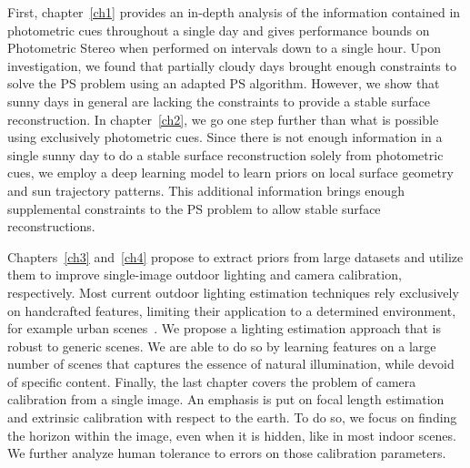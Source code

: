 First, chapter~\ref{ch1} provides an in-depth analysis of the information contained in photometric cues throughout a single day and gives performance bounds on Photometric Stereo when performed on intervals down to a single hour. Upon investigation, we found that partially cloudy days brought enough constraints to solve the PS problem using an adapted PS algorithm. However, we show that sunny days in general are lacking the constraints to provide a stable surface reconstruction. In chapter~\ref{ch2}, we go one step further than what is possible using exclusively photometric cues. Since there is not enough information in a single sunny day to do a stable surface reconstruction solely from photometric cues, we employ a deep learning model to learn priors on local surface geometry and sun trajectory patterns. This additional information brings enough supplemental constraints to the PS problem to allow stable surface reconstructions. 

Chapters~\ref{ch3} and~\ref{ch4} propose to extract priors from large datasets and utilize them to improve single-image outdoor lighting and camera calibration, respectively. Most current outdoor lighting estimation techniques rely exclusively on handcrafted features, limiting their application to a determined environment, for example urban scenes~\cite{lalonde-ijcv-12}. We propose a lighting estimation approach that is robust to generic scenes. We are able to do so by learning features on a large number of scenes that captures the essence of natural illumination, while devoid of specific content. Finally, the last chapter covers the problem of camera calibration from a single image. An emphasis is put on focal length estimation and extrinsic calibration with respect to the earth. To do so, we focus on finding the horizon within the image, even when it is hidden, like in most indoor scenes. We further analyze human tolerance to errors on those calibration parameters. 

